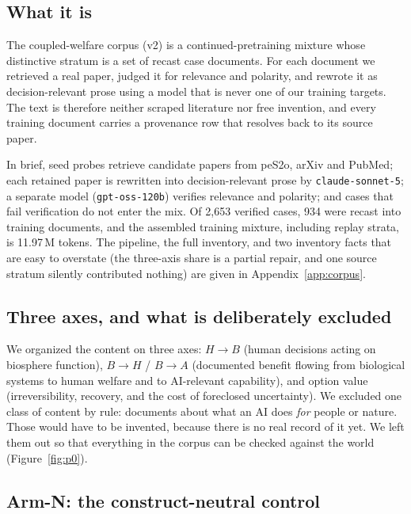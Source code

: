 \documentclass[11pt]{article}
\newcommand{\cw}{coupled-welfare}
\begin{document}
\subsection{What it is}

The \cw{} corpus (v2) is a continued-pretraining mixture whose distinctive stratum is a set of
recast case documents. For each document we retrieved a real paper, judged it for relevance and
polarity, and rewrote it as decision-relevant prose using a model that is never one of our training
targets. The text is therefore neither scraped literature nor free invention, and every training
document carries a provenance row that resolves back to its source paper.

In brief, seed probes retrieve candidate papers from peS2o, arXiv and PubMed; each retained paper is
rewritten into decision-relevant prose by \texttt{claude-sonnet-5}; a separate model
(\texttt{gpt-oss-120b}) verifies relevance and polarity; and cases that fail verification do not
enter the mix. Of 2{,}653 verified cases, 934 were recast into training documents, and the assembled
training mixture, including replay strata, is 11.97\,M tokens. The pipeline, the full inventory, and
two inventory facts that are easy to overstate (the three-axis share is a partial repair, and one
source stratum silently contributed nothing) are given in Appendix~\ref{app:corpus}.

\subsection{Three axes, and what is deliberately excluded}

We organized the content on three axes: $H\!\to\!B$ (human decisions acting on biosphere function),
$B\!\to\!H$ / $B\!\to\!A$ (documented benefit flowing from biological systems to human welfare and
to AI-relevant capability), and option value (irreversibility, recovery, and the cost of foreclosed
uncertainty). We excluded one class of content by rule: documents about what an AI does \emph{for} people or
nature. Those would have to be invented, because there is no real record of it yet. We left them out
so that everything in the corpus can be checked against the world (Figure~\ref{fig:p0}).

\subsection{Arm-N: the construct-neutral control}
\label{sec:armn-method}
\end{document}
